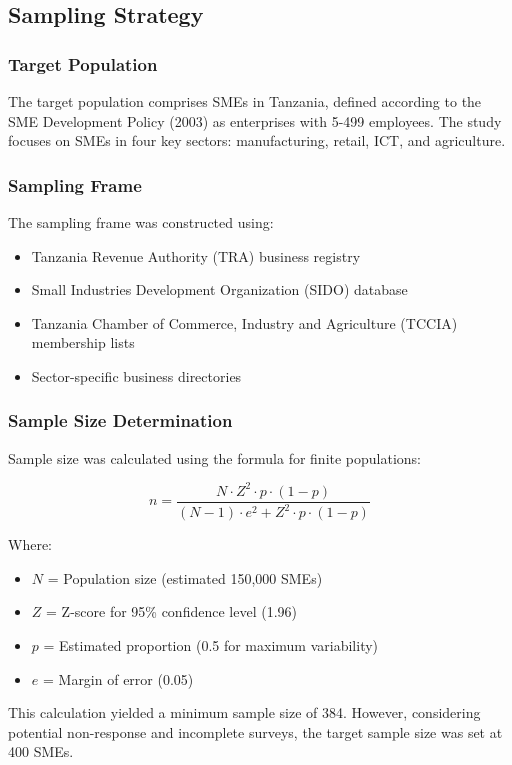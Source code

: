 \subsection{Sampling Strategy}

\subsubsection{Target Population}
The target population comprises SMEs in Tanzania, defined according to the SME Development Policy (2003) as enterprises with 5-499 employees. The study focuses on SMEs in four key sectors: manufacturing, retail, ICT, and agriculture.

\subsubsection{Sampling Frame}
The sampling frame was constructed using:
\begin{itemize}
    \item Tanzania Revenue Authority (TRA) business registry
    \item Small Industries Development Organization (SIDO) database
    \item Tanzania Chamber of Commerce, Industry and Agriculture (TCCIA) membership lists
    \item Sector-specific business directories
\end{itemize}

\subsubsection{Sample Size Determination}
Sample size was calculated using the formula for finite populations:

\[ n = \frac{N \cdot Z^2 \cdot p \cdot (1-p)}{(N-1) \cdot e^2 + Z^2 \cdot p \cdot (1-p)} \]

Where:
\begin{itemize}
    \item $N$ = Population size (estimated 150,000 SMEs)
    \item $Z$ = Z-score for 95\% confidence level (1.96)
    \item $p$ = Estimated proportion (0.5 for maximum variability)
    \item $e$ = Margin of error (0.05)
\end{itemize}

This calculation yielded a minimum sample size of 384. However, considering potential non-response and incomplete surveys, the target sample size was set at 400 SMEs.

